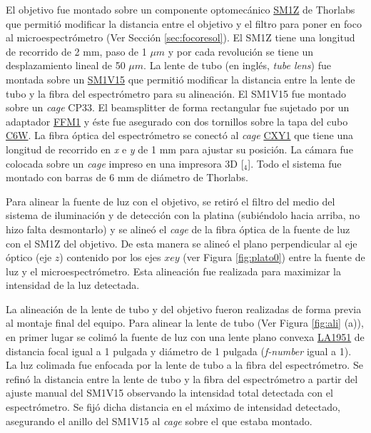 El objetivo fue montado sobre un componente optomecánico \href{https://www.thorlabs.com/thorProduct.cfm?partNumber=SM1Z\#ad-image-0}{SM1Z} de Thorlabs que permitió modificar la distancia entre el objetivo y el filtro para poner en foco al microespectrómetro (Ver Sección \ref{sec:focoresol}). El SM1Z tiene una longitud de recorrido de 2 mm, paso de 1 $\mu m$ y por cada revolución se tiene un desplazamiento lineal de 50 $\mu m$.  La lente de tubo (en inglés, \textit{tube lens}) fue montada sobre un \href{https://www.thorlabs.com/thorproduct.cfm?partnumber=SM1V15}{SM1V15} que permitió modificar la distancia entre la lente de tubo y la fibra del espectrómetro para su alineación. El SM1V15 fue montado sobre un \textit{cage} CP33. El beamsplitter de forma rectangular fue sujetado por un adaptador \href{https://www.thorlabs.com/thorproduct.cfm?partnumber=FFM1\#ad-image-0}{FFM1} y éste fue asegurado con dos tornillos sobre la tapa del cubo \href{https://www.thorlabs.com/thorproduct.cfm?partnumber=C6W}{C6W}. La fibra óptica del espectrómetro se conectó al \textit{cage} \href{https://www.thorlabs.com/thorproduct.cfm?partnumber=CXY1\#ad-image-0}{CXY1} que tiene una longitud de recorrido en \textit{x} e \textit{y} de 1 mm para ajustar su posición. La cámara fue colocada sobre un \textit{cage} impreso en una impresora 3D [\href{https://github.com/jrr1984/open_frame_XYStage/blob/master/3dprintedparts/STLs/CAGE\_1pulgada.STL}{\faCubes$_{4}$}]. Todo el sistema fue montado con barras de 6 mm de diámetro de Thorlabs.

Para alinear la fuente de luz con el objetivo, se retiró el filtro del medio del sistema de iluminación y de detección con la platina (subiéndolo hacia arriba, no hizo falta desmontarlo) y se alineó el \textit{cage} de la fibra óptica de la fuente de luz con el SM1Z del objetivo. De esta manera se alineó el plano perpendicular al eje óptico (eje $\textit{z}$) contenido por los ejes $\textit{x} e \textit{y}$ (ver Figura \ref{fig:plato0}) entre la fuente de luz y el microespectrómetro. Esta alineación fue realizada para maximizar la intensidad de la luz detectada.

La alineación de la lente de tubo y del objetivo fueron realizadas de forma previa al montaje final del equipo. Para alinear la lente de tubo (Ver Figura \ref{fig:ali} (a)), en primer lugar se colimó la fuente de luz con una lente plano convexa \href{https://www.thorlabs.com/thorproduct.cfm?partnumber=LA1951}{LA1951} de distancia focal igual a 1 pulgada y diámetro de 1 pulgada (\textit{f-number} igual a 1). La luz colimada fue enfocada por la lente de tubo a la fibra del espectrómetro. Se refinó la distancia entre la lente de tubo y la fibra del espectrómetro a partir del ajuste manual del SM1V15 observando la intensidad total detectada con el espectrómetro. Se fijó dicha distancia en el máximo de intensidad detectado, asegurando el anillo del SM1V15 al \textit{cage} sobre el que estaba montado.

